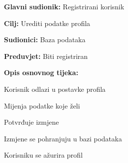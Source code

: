 					\noindent {}
					\begin{packed_item}
						
						\item \textbf{Glavni sudionik: }Registrirani korisnik
						\item  \textbf{Cilj:} Urediti podatke profila
						\item  \textbf{Sudionici:} Baza podataka
						\item  \textbf{Preduvjet:} Biti registriran
						\item  \textbf{Opis osnovnog tijeka:}
						
						\item[] \begin{packed_enum}
							
							\item Korisnik odlazi u postavke profila
							\item Mijenja podatke koje želi
							\item Potvrđuje izmjene
							\item Izmjene se pohranjuju u bazi podataka
							\item Korisniku se ažurira profil
						\end{packed_enum}
						
					\end{packed_item}
				
